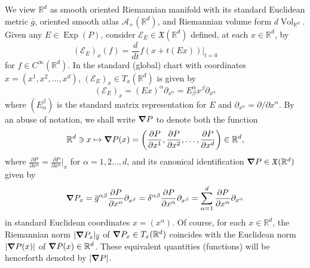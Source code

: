 \documentclass[11pt]{article}
\theoremstyle{remark}
\newcommand\Exp{\operatorname{Exp}}
\newcommand{\Vol}{\operatorname{Vol}}
\begin{document}
\noindent We view $\mathbb{R}^d$ as smooth oriented Riemannian manifold with its standard Euclidean metric $\overline{g}$, oriented smooth atlas $\mathcal{A}_+(\mathbb{R}^d)$, and Riemannian volume form $ d\Vol_{\mathbb{R}^d}$. Given any $E\in\Exp(P)$, consider $\mathcal{E}_E\in \mathfrak{X}(\mathbb{R}^d)$ defined, at each $x\in\mathbb{R}^d$, by
\begin{equation*}
    (\mathcal{E}_E)_x(f)=\frac{d}{dt}f(x+t(Ex))\big\vert_{t=0}\hspace{1cm}
\end{equation*}
for $f\in C^\infty(\mathbb{R}^d)$. In the standard (global) chart with coordinates $x=(x^1,x^2,\dots,x^d)$, $(\mathcal{E}_E)_{x}\in T_{x}(\mathbb{R}^d)$ is given by
\begin{equation*}
    (\mathcal{E}_E)_{x}=(Ex)^{\alpha}\partial_{x^\alpha}=E^\alpha_\beta x^{\beta}\partial_{x^\alpha}
\end{equation*}
where $(E_\alpha^\beta)$ is the standard matrix representation for $E$ and  $\partial_{x^{\alpha}}=\partial/\partial x^\alpha$. By an abuse of notation, we shall write $\grad P$ to denote both the function
\begin{equation*}
\mathbb{R}^d\ni x\mapsto \grad P(x)=\left(\frac{\partial P}{\partial x^1},\frac{\partial P}{\partial x^2},\dots,\frac{\partial P}{\partial x^d}\right)\in\mathbb{R}^d,
\end{equation*}
where $\frac{\partial P}{\partial x^{\alpha}}=\frac{\partial P}{\partial x^{\alpha}}\vert_{x}$ for $\alpha=1,2\dots,d$, and its canonical identification $\grad P\in \mathfrak{X}(\mathbb{R}^d)$ given by \begin{equation*}
    \grad P_x=\overline{g}^{\alpha\beta}\frac{\partial P}{\partial x^{\alpha}}\partial_{x^{\beta}}=\delta^{\alpha\beta}\frac{\partial P}{\partial x^{\alpha}}\partial_{x^{\beta}}=\sum_{\alpha=1}^d\frac{\partial P}{\partial x^{\alpha}}\partial_{x^\alpha}
\end{equation*}
in standard Euclidean coordinates $x=(x^\alpha)$. Of course, for each $x\in\mathbb{R}^d$, the Riemannian norm $|\grad P_x |_{\overline{g}}$ of $\grad P_x \in T_x (\mathbb{R}^d)$ coincides with the Euclidean norm $| \grad P(x) |$ of $ \grad P(x) \in \mathbb{R}^d$. These equivalent quantities (functions) will be henceforth denoted by $|\grad P|$.
\end{document}
